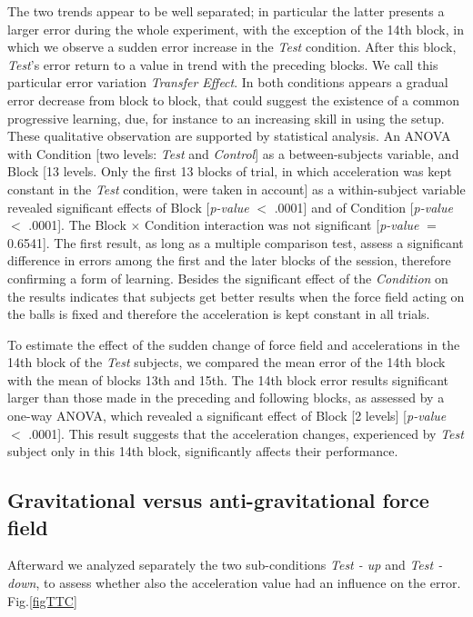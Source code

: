 The two trends appear to be well separated; in particular the latter presents a larger error during the whole experiment, with the exception of the 14th block, in which we observe a sudden error increase in the \textit{Test} condition. After this block, \textit{Test}'s error return to a value in trend with the preceding blocks. We call this particular error variation \textit{Transfer Effect}. In both conditions appears a gradual error decrease from block to block, that could suggest the existence of a common progressive learning, due, for instance to an increasing skill in using the setup.
These qualitative observation are supported by statistical analysis. An ANOVA with Condition [two levels: \textit{Test} and \textit{Control}] as a between-subjects variable, and Block [13 levels. Only the first 13 blocks of trial, in which acceleration was kept constant in the \textit{Test} condition, were taken in account] as a within-subject variable revealed significant effects of Block [\textit{p-value} $<$ .0001] and of Condition [\textit{p-value} $<$ .0001]. The Block $\times$ Condition interaction was not significant [\textit{p-value} $=$ 0.6541]. The first result, as long as a multiple comparison test, assess a significant difference in errors among the first and the later blocks of the session, therefore confirming a form of learning. Besides the significant effect of the \textit{Condition} on the results indicates that subjects get better results when the force field acting on the balls is fixed and therefore the acceleration is kept constant in all trials.

To estimate the effect of the sudden change of force field and accelerations in the 14th block of the \textit{Test} subjects, we compared the mean error of the 14th block with the mean of blocks 13th and 15th. The 14th block error results significant larger than those made in the preceding and following blocks, as assessed by a one-way ANOVA, which revealed a
significant effect of Block [2 levels] [\textit{p-value} $<$ .0001]. This result suggests that the acceleration changes, experienced by \textit{Test} subject only in this 14th block, significantly affects their performance.


\subsection{Gravitational versus anti-gravitational force field} \label{second_phase}

Afterward we analyzed separately the two sub-conditions \textit{Test - up} and \textit{Test - down}, to assess whether also the acceleration value had an influence on the error. Fig.\ref{figTTC} 

